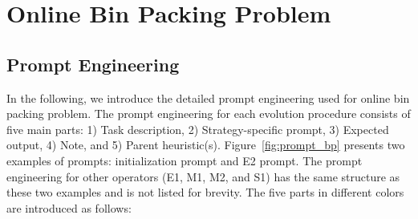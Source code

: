 


\section{Online Bin Packing Problem}

\subsection{Prompt Engineering}
In the following, we introduce the detailed prompt engineering used for online bin packing problem. The prompt engineering for each evolution procedure consists of five main parts: 1) Task description, 2) Strategy-specific prompt, 3) Expected output, 4) Note, and  5) Parent heuristic(s). Figure~\ref{fig:prompt_bp} presents two examples of prompts: initialization prompt and E2 prompt. The prompt engineering for other operators (E1, M1, M2, and S1) has the same structure as these two examples and is not listed for brevity. The five parts in different colors are introduced as follows:

